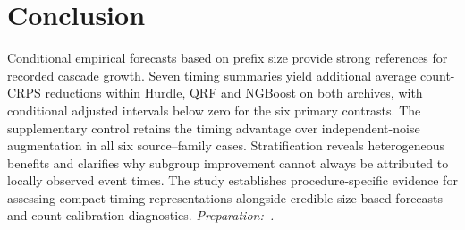 \hypertarget{conclusion}{%
\section{Conclusion}}

Conditional empirical forecasts based on prefix size provide strong references for recorded cascade growth. Seven timing summaries yield additional average count-CRPS reductions within Hurdle, QRF and NGBoost on both archives, with conditional adjusted intervals below zero for the six primary contrasts. The supplementary control retains the timing advantage over independent-noise augmentation in all six source--family cases. Stratification reveals heterogeneous benefits and clarifies why subgroup improvement cannot always be attributed to locally observed event times. The study establishes procedure-specific evidence for assessing compact timing representations alongside credible size-based forecasts and count-calibration diagnostics. {\small\textit{Preparation:~\cite{openai2026}.}}
